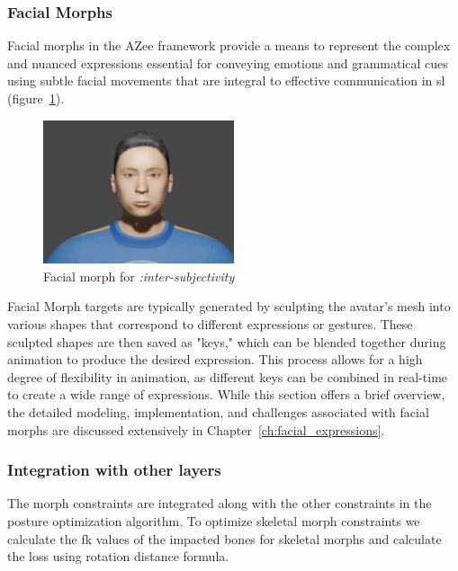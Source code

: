 \documentclass[../../main.tex]{subfiles}
\begin{document}
\subsubsection{Facial Morphs}
\label{ch:avatar_creation_pose_synthesis:proc_rig_signing_avatars:morph_constraints:facial_morphs}

Facial morphs in the AZee framework provide a means to represent the complex and nuanced expressions essential for conveying emotions and grammatical cues using subtle facial movements that are integral to effective communication in \gls{sl} (figure~\ref{fig:facial_example}).

\begin{figure}
    \centering
    \includegraphics[width=0.5\textwidth]{chapters/avatar_creation_pose_synthesis/images/facial_example.png}
    \caption{Facial morph for \emph{:inter-subjectivity}}
    \label{fig:facial_example}
\end{figure}

Facial Morph targets are typically generated by sculpting the avatar's mesh into various shapes that correspond to different expressions or gestures. These sculpted shapes are then saved as "keys," which can be blended together during animation to produce the desired expression. This process allows for a high degree of flexibility in animation, as different keys can be combined in real-time to create a wide range of expressions. While this section offers a brief overview, the detailed modeling, implementation, and challenges associated with facial morphs are discussed extensively in Chapter~\ref{ch:facial_expressions}.

\subsubsection{Integration with other layers}
\label{ch:avatar_creation_pose_synthesis:proc_rig_signing_avatars:morph_constraints:integration}

The morph constraints are integrated along with the other constraints in the posture optimization algorithm. To optimize skeletal morph constraints we calculate the \gls{fk} values of the impacted bones for skeletal morphs and calculate the loss using rotation distance formula.
\end{document}
